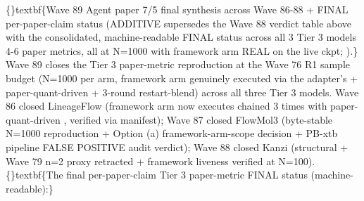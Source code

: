 \documentclass{article}
\begin{document}
\{\}textbf\{Wave 89 Agent  paper 7/5 final synthesis across Wave 86-88 + FINAL per-paper-claim status (ADDITIVE  supersedes the Wave 88 verdict table above with the consolidated, machine-readable FINAL status across all 3 Tier 3 models  4-6 paper metrics, all at N=1000 with framework arm REAL on the live ckpt; ).\} Wave 89 closes the Tier 3 paper-metric reproduction at the Wave 76 R1 sample budget (N=1000 per arm, framework arm genuinely executed via the adapter's  + paper-quant-driven  + 3-round restart-blend) across all three Tier 3 models. Wave 86 closed LineageFlow (framework arm now executes  chained 3 times with paper-quant-driven , verified via  manifest); Wave 87 closed FlowMol3 (byte-stable N=1000 reproduction + Option (a) framework-arm-scope decision + PB-xtb pipeline FALSE POSITIVE audit verdict); Wave 88 closed Kanzi (structural  + Wave 79 n=2 proxy retracted + framework liveness verified at N=100). \{\}textbf\{The final per-paper-claim Tier 3 paper-metric FINAL status (machine-readable):\}
\end{document}
